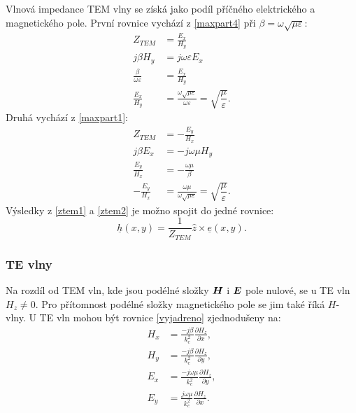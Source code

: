 \documentclass[12pt,a4paper,oneside]{article}
\numberwithin{equation}{section} %
\numberwithin{figure}{section} %
\numberwithin{table}{section} %
\renewcommand{\vec}[1]{\mbox{\boldmath$#1$}} %
\newcommand{\faz}[1]{{\underline{#1}}} %
\begin{document}
Vlnová impedance TEM vlny se získá jako podíl příčného elektrického a magnetického pole. První rovnice vychází z \ref{maxpart4} při $\beta = \omega \sqrt{\mu \varepsilon}$:
\begin{subequations}
\label{ztem1}
\begin{align}
Z_{TEM} &= \frac{E_x}{H_y}
\\
j \beta H_y &= j \omega \varepsilon E_x
\\
\frac{\beta}{\omega \varepsilon} &= \frac{E_x}{H_y}
\\
\frac{E_x}{H_y} &= \frac{\omega \sqrt{\mu \varepsilon}}{\omega \varepsilon} = \sqrt{\dfrac{\mu}{\varepsilon}} .
\end{align}
\end{subequations}
Druhá vychází z \ref{maxpart1}:
\begin{subequations}
\label{ztem2}
\begin{align}
Z_{TEM} &= - \frac{E_y}{H_x}
\\
j \beta E_x &= - j \omega \mu H_y
\\
\frac{E_y}{H_x} &= - \frac{\omega \mu}{\beta}
\\
- \frac{E_y}{H_x} &= \frac{\omega \mu}{\omega \sqrt{\mu \varepsilon}} = \sqrt{\dfrac{\mu}{\varepsilon}} .
\end{align}
\end{subequations}
Výsledky z \ref{ztem1} a \ref{ztem2} je možno spojit do jedné rovnice:
\begin{equation}
\faz{h} (x, y) = \frac{1}{Z_{TEM}} \hat{z} \times \faz{e} (x, y) .
\end{equation}


\subsubsection{TE vlny}
Na rozdíl od TEM vln, kde jsou podélné složky $\vec{H}$ i $\vec{E}$ pole nulové, se u TE vln $H_z  \neq 0$. Pro přítomnost podélné složky magnetického pole se jim také říká $H$-vlny. U TE vln mohou být rovnice \ref{vyjadreno} zjednodušeny na:
\begin{subequations}
\begin{align}
H_x &= \frac{-j \beta}{k^2_c} \frac{\partial H_z}{\partial x} ,
\\
H_y &= \frac{-j \beta}{k^2_c} \frac{\partial H_z}{\partial y} ,
\\
E_x &= \frac{-j \omega \mu}{k^2_c} \frac{\partial H_z}{\partial y} ,
\\
E_y &= \frac{j \omega \mu}{k^2_c} \frac{\partial H_z}{\partial x} .
\end{align}
\end{subequations}
\end{document}

